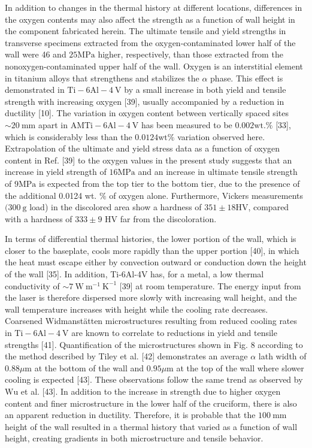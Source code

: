 \documentclass[10pt]{article}
\begin{document}
In addition to changes in the thermal history at different locations, differences in the oxygen contents may also affect the strength as a function of wall height in the component fabricated herein. The ultimate tensile and yield strengths in transverse specimens extracted from the oxygen-contaminated lower half of the wall were 46 and $25 \mathrm{MPa}$ higher, respectively, than those extracted from the nonoxygen-contaminated upper half of the wall. Oxygen is an interstitial element in titanium alloys that strengthens and stabilizes the $\alpha$ phase. This effect is demonstrated in $\mathrm{Ti}-6 \mathrm{Al}-4 \mathrm{~V}$ by a small increase in both yield and tensile strength with increasing oxygen [39], usually accompanied by a reduction in ductility [10]. The variation in oxygen content between vertically spaced sites $\sim 20 \mathrm{~mm}$ apart in $\mathrm{AM} \mathrm{Ti}-6 \mathrm{Al}-4 \mathrm{~V}$ has been measured to be $0.002 \mathrm{wt} . \%$ [33], which is considerably less than the $0.0124 \mathrm{wt} \%$ variation observed here. Extrapolation of the ultimate and yield stress data as a function of oxygen content in Ref. [39] to the oxygen values in the present study suggests that an increase in yield strength of $16 \mathrm{MPa}$ and an increase in ultimate tensile strength of $9 \mathrm{MPa}$ is expected from the top tier to the bottom tier, due to the presence of the additional 0.0124 wt. $\%$ of oxygen alone. Furthermore, Vickers measurements $(300 \mathrm{~g}$ load) in the discolored area show a hardness of $351 \pm 18 \mathrm{HV}$, compared with a hardness of $333 \pm 9$ $\mathrm{HV}$ far from the discoloration.

In terms of differential thermal histories, the lower portion of the wall, which is closer to the baseplate, cools more rapidly than the upper portion [40], in which the heat must escape either by convection outward or conduction down the height of the wall [35]. In addition, Ti-6Al-4V has, for a metal, a low thermal conductivity of $\sim 7 \mathrm{~W} \mathrm{~m}^{-1} \mathrm{~K}^{-1}$ [39] at room temperature. The energy input from the laser is therefore dispersed more slowly with increasing wall height, and the wall temperature increases with height while the cooling rate decreases. Coarsened Widmanstätten microstructures resulting from reduced cooling rates in $\mathrm{Ti}-6 \mathrm{Al}-4 \mathrm{~V}$ are known to correlate to reductions in yield and tensile strengths [41]. Quantification of the microstructures shown in Fig. 8 according to the method described by Tiley et al. [42] demonstrates an average $\alpha$ lath width of $0.88 \mu \mathrm{m}$ at the bottom of the wall and $0.95 \mu \mathrm{m}$ at the top of the wall where slower cooling is expected [43]. These observations follow the same trend as observed by $\mathrm{Wu}$ et al. [43]. In addition to the increase in strength due to higher oxygen content and finer microstructure in the lower half of the cruciform, there is also an apparent reduction in ductility. Therefore, it is probable that the $100 \mathrm{~mm}$ height of the wall resulted in a thermal history that varied as a function of wall height, creating gradients in both microstructure and tensile behavior.
\end{document}
